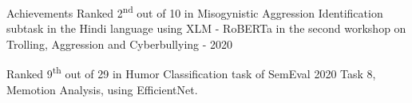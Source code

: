 \documentclass{resume} %
\begin{document}
\begin{rSection}{Achievements}
    Ranked 2\textsuperscript{nd} out of 10 in Misogynistic Aggression Identification subtask in the 
    Hindi language using XLM - RoBERTa in the second workshop on Trolling, Aggression and Cyberbullying - 2020
    
    Ranked 9\textsuperscript{th} out of 29 in Humor Classification task of 
    SemEval 2020 Task 8, Memotion Analysis, using EfficientNet.
\end{rSection}
\end{document}
